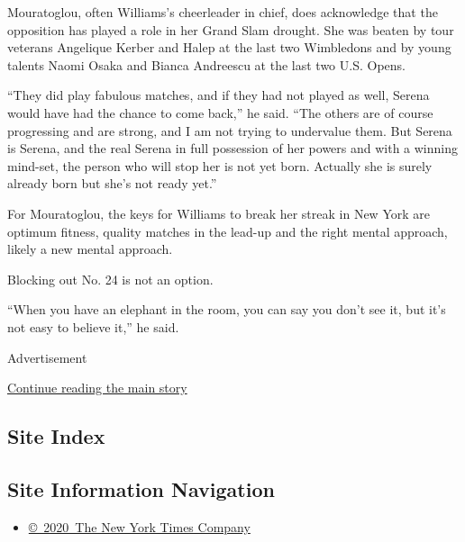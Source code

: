 Mouratoglou, often Williams's cheerleader in chief, does acknowledge
that the opposition has played a role in her Grand Slam drought. She was
beaten by tour veterans Angelique Kerber and Halep at the last two
Wimbledons and by young talents Naomi Osaka and Bianca Andreescu at the
last two U.S. Opens.

``They did play fabulous matches, and if they had not played as well,
Serena would have had the chance to come back,'' he said. ``The others
are of course progressing and are strong, and I am not trying to
undervalue them. But Serena is Serena, and the real Serena in full
possession of her powers and with a winning mind-set, the person who
will stop her is not yet born. Actually she is surely already born but
she's not ready yet.''

For Mouratoglou, the keys for Williams to break her streak in New York
are optimum fitness, quality matches in the lead-up and the right mental
approach, likely a new mental approach.

Blocking out No. 24 is not an option.

``When you have an elephant in the room, you can say you don't see it,
but it's not easy to believe it,'' he said.

Advertisement

\protect\hyperlink{after-bottom}{Continue reading the main story}

\hypertarget{site-index}{%
\subsection{Site Index}\label{site-index}}

\hypertarget{site-information-navigation}{%
\subsection{Site Information
Navigation}\label{site-information-navigation}}

\begin{itemize}
\tightlist
\item
  \href{https://help.nytimes.com/hc/en-us/articles/115014792127-Copyright-notice}{©~2020~The
  New York Times Company}
\end{itemize}

